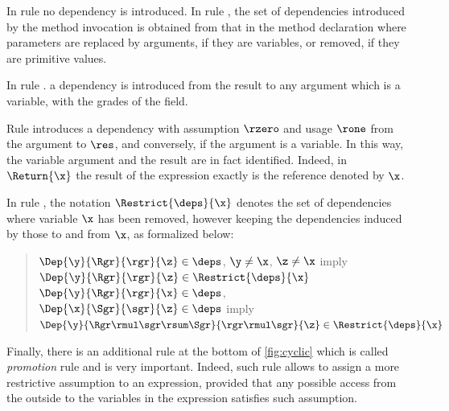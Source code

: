 In rule  no dependency is introduced.  In rule , the set of dependencies introduced by the method invocation is obtained from that in the method declaration where parameters are replaced by arguments, if they are variables, or removed, if they are primitive values. 

In rule . a dependency is introduced from the result to any argument which is a variable, with the \bez grades \eez of the field.

 Rule  introduces a dependency \bez with assumption $\rzero$ and usage $\rone$ \eez from the argument to $\res$, and conversely, if the argument is a variable. 
 \bez In this way, the variable argument and the result are in fact identified.  \eez Indeed, in $\Return{\x}$ the result of the expression exactly is the reference denoted by $\x$.

In rule , the notation 
$\Restrict{\deps}{\x}$ denotes the set of dependencies where variable $\x$ has been removed, however keeping the dependencies induced by those to  and from $\x$, as formalized below:
\begin{quote}
$\Dep{\y}{\Rgr}{\rgr}{\z}\in\deps$, $\y\neq\x$, $\z\neq\x$ imply $\Dep{\y}{\Rgr}{\rgr}{\z}\in\Restrict{\deps}{\x}$\\
$\Dep{\y}{\Rgr}{\rgr}{\x}\in\deps$, $\Dep{\x}{\Sgr}{\sgr}{\z}\in\deps$ imply $\Dep{\y}{\Rgr\rmul\sgr\rsum\Sgr}{\rgr\rmul\sgr}{\z}\in\Restrict{\deps}{\x}$
\end{quote}

Finally, there is an additional rule at the bottom of \cref{fig:cyclic} which is called \emph{promotion} rule and is very important. Indeed, such rule allows to assign a more restrictive assumption to an expression, provided that any possible access from the outside to the variables in the expression satisfies such assumption. 

